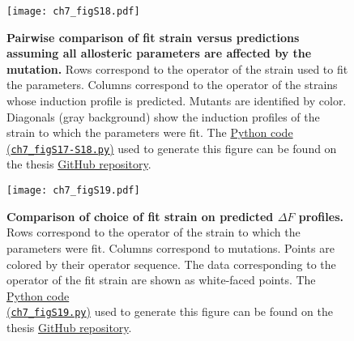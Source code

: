 \documentclass[12pt]{caltech_thesis}
\begin{document}
\hypertarget{fig:KaKi_epAI_pairwise_comparison}{%
\begin{figure}
\centering
\texttt{[image: ch7\_figS18.pdf]}
\caption[{Pairwise comparison of fit strain versus predictions assuming
all allosteric parameters are affected by the mutation in the inducer
binding domain.}]{\textbf{Pairwise comparison of fit strain versus
predictions assuming all allosteric parameters are affected by the
mutation.} Rows correspond to the operator of the strain used to fit the
parameters. Columns correspond to the operator of the strains whose
induction profile is predicted. Mutants are identified by color.
Diagonals (gray background) show the induction profiles of the strain to
which the parameters were fit. The
\href{https://github.com/gchure/phd/blob/master/src/chapter_07/code/ch7_figS17-S18.py}{Python
code\\
(\texttt{ch7\_figS17-S18.py})} used to generate this figure can be found
on the thesis \href{https://github.com/gchure/phd}{GitHub repository}.}
\label{fig:KaKi_epAI_pairwise_comparison}
\end{figure}
}

\hypertarget{fig:IND_deltaF_comparison}{%
\begin{figure}
\centering
\texttt{[image: ch7\_figS19.pdf]}
\caption[{Comparison of choice of fit strain on predicted \(\Delta F\)
profiles for inducer binding domain mutants.}]{\textbf{Comparison of
choice of fit strain on predicted \(\Delta F\) profiles.} Rows
correspond to the operator of the strain to which the parameters were
fit. Columns correspond to mutations. Points are colored by their
operator sequence. The data corresponding to the operator of the fit
strain are shown as white-faced points. The
\href{https://github.com/gchure/phd/blob/master/src/chapter_07/code/ch7_figS19.py}{Python
code\\
(\texttt{ch7\_figS19.py})} used to generate this figure can be found on
the thesis \href{https://github.com/gchure/phd}{GitHub repository}.}
\label{fig:IND_deltaF_comparison}
\end{figure}
}
\end{document}
